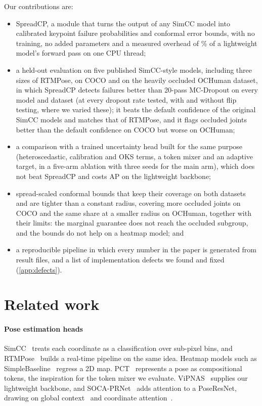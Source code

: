\documentclass[preprint,11pt]{elsarticle}
\newcommand{\method}{SpreadCP}
\begin{document}
Our contributions are:
\begin{itemize}
\item \method{}, a module that turns the output of any SimCC model into calibrated keypoint failure
probabilities and conformal error bounds, with no training, no added parameters and a measured
overhead of \MethodCpuPct\% of a lightweight model's forward pass on one CPU thread;
\item a held-out evaluation on five published SimCC-style models, including three sizes of RTMPose, on
COCO and on the heavily occluded OCHuman dataset, in which \method{} detects failures better than 20-pass
MC-Dropout on every model and dataset (at every dropout rate tested, with and without flip testing,
where we varied these); it beats the default confidence of the original SimCC models and matches that of
RTMPose, and it flags occluded joints better than the default confidence on COCO but worse on OCHuman;
\item a comparison with a trained uncertainty head built for the same purpose (heteroscedastic,
calibration and OKS terms, a token mixer and an adaptive target, in a five-arm ablation with three
seeds for the main arm), which does not beat \method{} and costs AP on the lightweight backbone;
\item spread-scaled conformal bounds that keep their coverage on both datasets and are tighter than a
constant radius, covering more occluded joints on COCO and the same share at a smaller radius on
OCHuman, together with their limits: the marginal guarantee does not reach the occluded subgroup, and
the bounds do not help on a heatmap model; and
\item a reproducible pipeline in which every number in the paper is generated from result files,
and a list of implementation defects we found and fixed (\ref{app:defects}).
\end{itemize}

\section{Related work}

\paragraph{Pose estimation heads} SimCC~\cite{li2022simcc} treats each coordinate as a
classification over sub-pixel bins, and RTMPose~\cite{jiang2023rtmpose} builds a real-time
pipeline on the same idea. Heatmap models such as SimpleBaseline~\cite{xiao2018simple} regress a
2D map. PCT~\cite{geng2023pct} represents a pose as compositional tokens, the inspiration for the
token mixer we evaluate. ViPNAS~\cite{xu2021vipnas} supplies our lightweight backbone, and
SOCA-PRNet~\cite{zakir2024soca} adds attention to a PoseResNet, drawing on global
context~\cite{cao2019gcnet} and coordinate attention~\cite{hou2021coordinate}.
\end{document}

